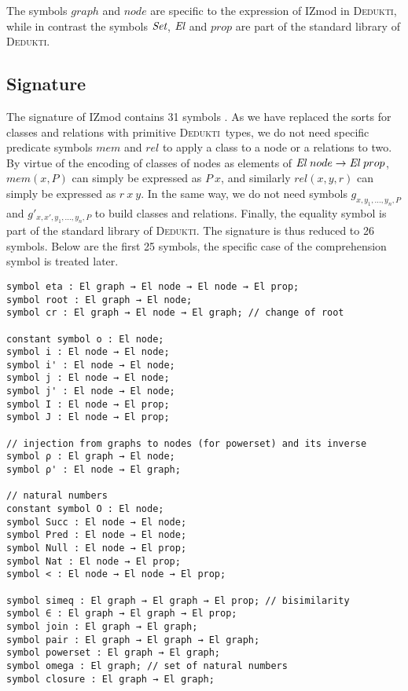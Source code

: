 \documentclass[submission,copyright,creativecommons]{eptcs}
\def\ra{\rightarrow}
\def\Set{\mbox{\it Set}}
\def\El{{\mbox{\it El}}}
\newcommand{\dedukti}{\textsc{Dedukti}}
\begin{document}
The symbols $graph$ and $node$ are specific to the expression of IZmod in \dedukti, while in contrast the symbols $\Set$, $\El$ and $prop$ are part of the standard library of \dedukti.

\subsection{Signature}

The signature of IZmod contains 31 symbols \cite[see Table 2]{zermodulo}. As we have replaced the sorts for classes and relations with primitive \dedukti ~types, we do not need specific predicate symbols $mem$ and $rel$ to apply a class to a node or a relations to two. By virtue of the encoding of classes of nodes as elements of $\El~node \ra \El~prop$, $mem(x,P)$ can simply be expressed as $P~x$, and similarly $rel(x,y,r)$ can simply be expressed as $r~x~y$. In the same way, we do not need symbols $g_{x,y_1,...,y_n,P}$ and $g'_{x,x',y_1,...,y_n,P}$ to build classes and relations. Finally, the equality symbol is part of the standard library of \dedukti. The signature is thus reduced to 26 symbols. Below are the first 25 symbols, the specific case of the comprehension symbol is treated later.

\begin{lstlisting}
symbol eta : El graph → El node → El node → El prop;
symbol root : El graph → El node;
symbol cr : El graph → El node → El graph; // change of root

constant symbol o : El node;
symbol i : El node → El node;
symbol i' : El node → El node;
symbol j : El node → El node;
symbol j' : El node → El node;
symbol I : El node → El prop;
symbol J : El node → El prop;

// injection from graphs to nodes (for powerset) and its inverse
symbol ρ : El graph → El node;
symbol ρ' : El node → El graph;

// natural numbers
constant symbol O : El node;
symbol Succ : El node → El node;
symbol Pred : El node → El node;
symbol Null : El node → El prop;
symbol Nat : El node → El prop;
symbol < : El node → El node → El prop;

symbol simeq : El graph → El graph → El prop; // bisimilarity
symbol ∈ : El graph → El graph → El prop;
symbol join : El graph → El graph;
symbol pair : El graph → El graph → El graph;
symbol powerset : El graph → El graph;
symbol omega : El graph; // set of natural numbers
symbol closure : El graph → El graph;
\end{lstlisting}
\end{document}
